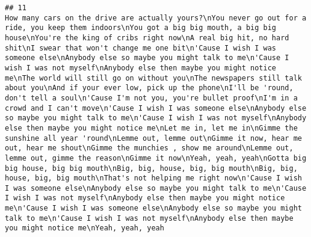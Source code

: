 \documentclass[]{article}
\begin{document}
\begin{verbatim}
## 11                                                                                                                                                                                                                                                                                                                                                                                                                                                                                                                                                                                                                                                                                                                                                                                                                                                                                                                                                                                                                                                                                                                                                                                                                                                                                                                                                                                                                                                                                                                                                                                                       How many cars on the drive are actually yours?\nYou never go out for a ride, you keep them indoors\nYou got a big big mouth, a big big house\nYou're the king of cribs right now\nA real big hit, no hard shit\nI swear that won't change me one bit\n'Cause I wish I was someone else\nAnybody else so maybe you might talk to me\n'Cause I wish I was not myself\nAnybody else then maybe you might notice me\nThe world will still go on without you\nThe newspapers still talk about you\nAnd if your ever low, pick up the phone\nI'll be 'round, don't tell a soul\n'Cause I'm not you, you're bullet proof\nI'm in a crowd and I can't move\n'Cause I wish I was someone else\nAnybody else so maybe you might talk to me\n'Cause I wish I was not myself\nAnybody else then maybe you might notice me\nLet me in, let me in\nGimme the sunshine all year 'round\nLemme out, lemme out\nGimme it now, hear me out, hear me shout\nGimme the munchies , show me around\nLemme out, lemme out, gimme the reason\nGimme it now\nYeah, yeah, yeah\nGotta big big house, big big mouth\nBig, big, house, big, big mouth\nBig, big, house, big, big mouth\nThat's not helping me right now\n'Cause I wish I was someone else\nAnybody else so maybe you might talk to me\n'Cause I wish I was not myself\nAnybody else then maybe you might notice me\n'Cause I wish I was someone else\nAnybody else so maybe you might talk to me\n'Cause I wish I was not myself\nAnybody else then maybe you might notice me\nYeah, yeah, yeah

\end{verbatim}
\end{document}
